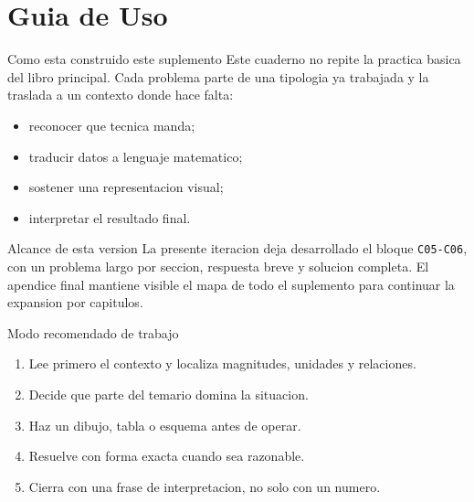 \chapter{Guia de Uso}

\begin{planningbox}{Como esta construido este suplemento}
Este cuaderno no repite la practica basica del libro principal. Cada problema parte de una
tipologia ya trabajada y la traslada a un contexto donde hace falta:
\begin{itemize}
  \item reconocer que tecnica manda;
  \item traducir datos a lenguaje matematico;
  \item sostener una representacion visual;
  \item interpretar el resultado final.
\end{itemize}
\end{planningbox}

\begin{databox}{Alcance de esta version}
La presente iteracion deja desarrollado el bloque \texttt{C05-C06}, con un problema largo por
seccion, respuesta breve y solucion completa. El apendice final mantiene visible el mapa de
todo el suplemento para continuar la expansion por capitulos.
\end{databox}

\begin{methodbox}{Modo recomendado de trabajo}
\begin{enumerate}
  \item Lee primero el contexto y localiza magnitudes, unidades y relaciones.
  \item Decide que parte del temario domina la situacion.
  \item Haz un dibujo, tabla o esquema antes de operar.
  \item Resuelve con forma exacta cuando sea razonable.
  \item Cierra con una frase de interpretacion, no solo con un numero.
\end{enumerate}
\end{methodbox}
